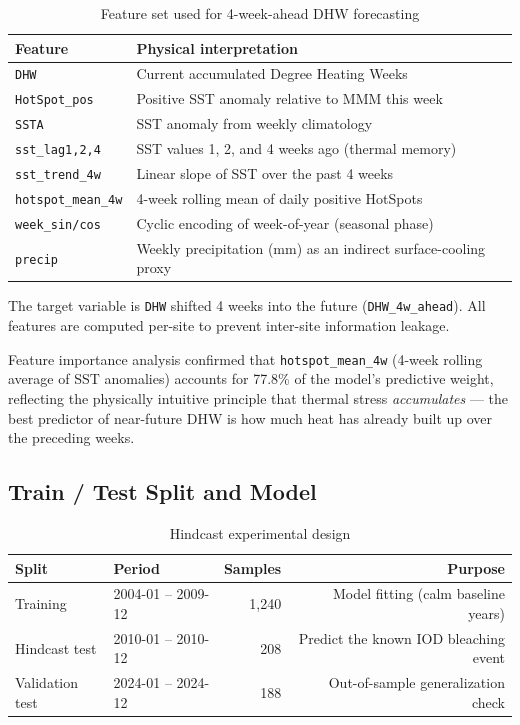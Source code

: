 \documentclass[12pt,a4paper]{report}
\begin{document}
\begin{table}[H]
\centering
\caption{Feature set used for 4-week-ahead DHW forecasting}
\begin{tabular}{lp{8cm}}
\toprule
\textbf{Feature} & \textbf{Physical interpretation} \\
\midrule
\rowcolor{rowgray}
\texttt{DHW}            & Current accumulated Degree Heating Weeks \\
\texttt{HotSpot\_pos}  & Positive SST anomaly relative to MMM this week \\
\rowcolor{rowgray}
\texttt{SSTA}           & SST anomaly from weekly climatology \\
\texttt{sst\_lag1,2,4} & SST values 1, 2, and 4 weeks ago (thermal memory) \\
\rowcolor{rowgray}
\texttt{sst\_trend\_4w}& Linear slope of SST over the past 4 weeks \\
\texttt{hotspot\_mean\_4w} & 4-week rolling mean of daily positive HotSpots \\
\rowcolor{rowgray}
\texttt{week\_sin/cos} & Cyclic encoding of week-of-year (seasonal phase) \\
\texttt{precip}        & Weekly precipitation (mm) as an indirect surface-cooling proxy \\
\bottomrule
\end{tabular}
\label{tab:hindcast_features}
\end{table}

The target variable is \texttt{DHW} shifted 4 weeks into the future (\texttt{DHW\_4w\_ahead}).
All features are computed per-site to prevent inter-site information leakage.

Feature importance analysis confirmed that \texttt{hotspot\_mean\_4w} (4-week rolling
average of SST anomalies) accounts for 77.8\% of the model's predictive weight,
reflecting the physically intuitive principle that thermal stress \textit{accumulates}
--- the best predictor of near-future DHW is how much heat has already built up over
the preceding weeks.

\subsection{Train / Test Split and Model}

\begin{table}[H]
\centering
\caption{Hindcast experimental design}
\begin{tabular}{llrr}
\toprule
\textbf{Split}  & \textbf{Period} & \textbf{Samples} & \textbf{Purpose} \\
\midrule
\rowcolor{rowgray}
Training        & 2004-01 -- 2009-12 & 1,240 & Model fitting (calm baseline years) \\
Hindcast test   & 2010-01 -- 2010-12 &   208 & Predict the known IOD bleaching event \\
\rowcolor{rowgray}
Validation test & 2024-01 -- 2024-12 &   188 & Out-of-sample generalization check \\
\bottomrule
\end{tabular}
\label{tab:hindcast_split}
\end{table}
\end{document}
